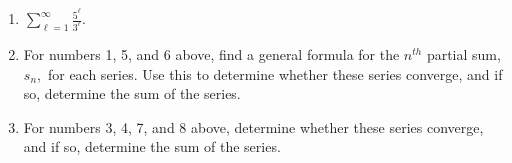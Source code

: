 \documentclass[12pt]{article}
\newif\ifans
\begin{document}
\begin{enumerate}
\ifans{\fbox{\parbox{1\linewidth}{$s_3=\frac{3^4}{4^3}
\\s_4=\frac{3^4}{4^3}+\frac{3^4}{4^3}\left(\frac{3}{4}\right)
\\s_5=\frac{3^4}{4^3}+\frac{3^4}{4^3}\left(\frac{3}{4}\right)+\frac{3^4}{4^3}\left(\frac{3}{4}\right)^2
\\s_6=\frac{3^4}{4^3}+\frac{3^4}{4^3}\left(\frac{3}{4}\right)+\frac{3^4}{4^3}\left(\frac{3}{4}\right)^2+\frac{3^4}{4^3}\left(\frac{3}{4}\right)^3$   }}} \fi

\item $\sum_{\ell=1}^{\infty}\frac{5^{\ell}}{3^{\ell}}.$

\ifans{\fbox{\parbox{1\linewidth}{$s_1=\frac{5}{3}
\\s_2=\frac{5}{3}+\left(\frac{5}{3}\right)^2
\\s_3=\frac{5}{3}+\left(\frac{5}{3}\right)^2+\left(\frac{5}{3}\right)^3
\\s_4=\frac{5}{3}+\left(\frac{5}{3}\right)^2+\left(\frac{5}{3}\right)^3+\left(\frac{5}{3}\right)^4$   }}} \fi

\item For numbers 1, 5, and 6 above, find a general formula for the $n^{\mathit{th}}$ partial sum, $s_{n},$ for each series.  Use this to determine
whether these series converge, and if so, determine the sum of the series. 

\ifans{\fbox{\parbox{1\linewidth}{
Problem $1$: $s_n=\frac{1}{2}n$, and so $\lim_{n \rightarrow +\infty}s_n = +\infty$.  Thus, the series diverges.
\\Problem $5$: $s_n=1 - \frac{1}{n+1}$, and so $\lim_{n \rightarrow +\infty}s_n = 1$.  Thus, the sum of the series is $1$.
\\ \\ Problem $6$: $s_n=1 - 7^{(n+1)}$, and so $\lim_{n \rightarrow +\infty}s_n = -\infty$.  Thus, the series diverges.
 }}} \fi

\item For numbers 3, 4, 7, and 8 above, determine whether these series converge, and if so, determine the sum of the series.


\end{enumerate}
\end{document}
